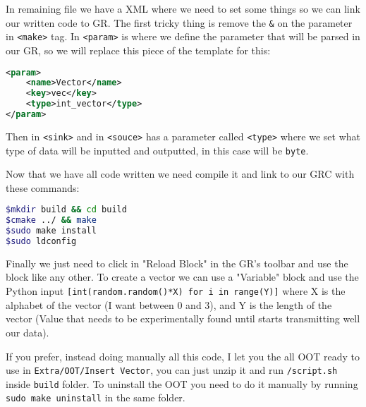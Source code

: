 \documentclass[a4paper, 10pt, conference]{ieeeconf}      %
\begin{document}
    In remaining file we have a XML where we need to set some things so we can link our written code to GR. The first tricky thing is remove the \verb|&| on the parameter in \verb|<make>| tag. 
    In \verb|<param>| is where we define the parameter that will be parsed in our GR, so we will replace this piece of the template for this:
\begin{lstlisting}[language=xml, breaklines]
<param>
    <name>Vector</name>
    <key>vec</key>
    <type>int_vector</type>
</param>
\end{lstlisting}
    Then in \verb|<sink>| and in \verb|<souce>| has a parameter called \verb|<type>| where we set what type of data will be inputted and outputted, in this case will be \verb|byte|.

    Now that we have all code written we need compile it and link to our GRC with these commands:
    
\begin{lstlisting}[language=bash, breaklines]
$mkdir build && cd build
$cmake ../ && make
$sudo make install
$sudo ldconfig
\end{lstlisting}
    
    Finally we just need to click in "Reload Block" in the GR's toolbar and use the block like any other. To create a vector we can use a "Variable" block and use the Python input \verb|[int(random.random()*X) for i in range(Y)]| where X is the alphabet of the vector (I want between 0 and 3), and Y is the length of the vector (Value that needs to be experimentally found until starts transmitting well our data).
    
    If you prefer, instead doing manually all this code, I let you the all OOT ready to use in \verb|Extra/OOT/Insert Vector|, you can just unzip it and run \verb|/script.sh| inside \verb|build| folder. To uninstall the OOT you need to do it manually by running \verb|sudo make uninstall| in the same folder.
    
\end{document}
